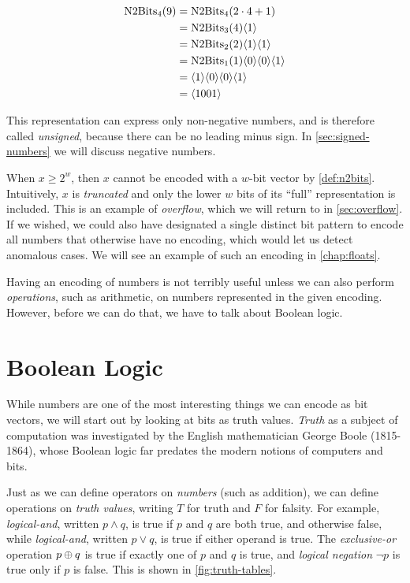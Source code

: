   \begin{example}
\begin{align}
  \mathrm{N2Bits}_{4}(9) &= \mathrm{N2Bits}_{4}(2\cdot{}4 + 1) \\
            &= \mathrm{N2Bits}_{3}(4) \langle 1 \rangle \\
            &= \mathrm{N2Bits}_{2}(2) \langle 1 \rangle \langle 1 \rangle \\
            &= \mathrm{N2Bits}_{1}(1) \langle 0 \rangle \langle 0 \rangle \langle 1 \rangle \\
            &= \langle 1 \rangle \langle 0 \rangle \langle 0 \rangle \langle 1 \rangle \\
            &= \langle 1001 \rangle
\end{align}
  \end{example}

This representation can express only non-negative numbers, and is
therefore called \emph{unsigned}, because there can be no leading
minus sign. In \cref{sec:signed-numbers} we will discuss negative
numbers.

When $x \geq 2^{w}$, then $x$ cannot be encoded with a $w$-bit vector
by \cref{def:n2bits}.  Intuitively, $x$ is \emph{truncated} and only
the lower $w$ bits of its ``full'' representation is included.  This
is an example of \emph{overflow}, which we will return to in
\cref{sec:overflow}.  If we wished, we could also have designated a
single distinct bit pattern to encode all numbers that otherwise have
no encoding, which would let us detect anomalous cases.  We will see
an example of such an encoding in \cref{chap:floats}.

Having an encoding of numbers is not terribly useful unless we can
also perform \emph{operations}, such as arithmetic, on numbers
represented in the given encoding.  However, before we can do that,
we have to talk about Boolean logic.

\section{Boolean Logic}
\label{sec:boolean-logic}

While numbers are one of the most interesting things we can encode as
bit vectors, we will start out by looking at bits as truth values.
\emph{Truth} as a subject of computation was investigated by the
English mathematician George Boole (1815-1864), whose Boolean logic
far predates the modern notions of computers and bits.

Just as we can define operators on \emph{numbers} (such as addition),
we can define operations on \emph{truth values}, writing $T$ for truth
and $F$ for falsity.  For example, \emph{logical-and}, written
$p \land q$, is true if $p$ and $q$ are both true, and otherwise
false, while \emph{logical-and}, written $p \lor q$, is true if either
operand is true.  The \emph{exclusive-or} operation $p \oplus q$ is
true if exactly one of $p$ and $q$ is true, and \emph{logical
  negation} $\neg p$ is true only if $p$ is false.  This is shown in
\cref{fig:truth-tables}.

